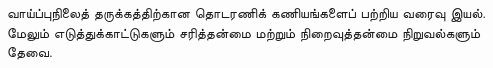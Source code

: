 \documentclass[../../../include/open-logic-chapter]{subfiles}
\begin{document}
\begin{editorial}
  வாய்ப்புநிலைத் தருக்கத்திற்கான தொடரணிக் கணியங்களைப் பற்றிய வரைவு இயல்.
  மேலும் எடுத்துக்காட்டுகளும் சரித்தன்மை மற்றும் நிறைவுத்தன்மை நிறுவல்களும்
  தேவை.
\end{editorial}


\OLEndChapterHook
\end{document}
